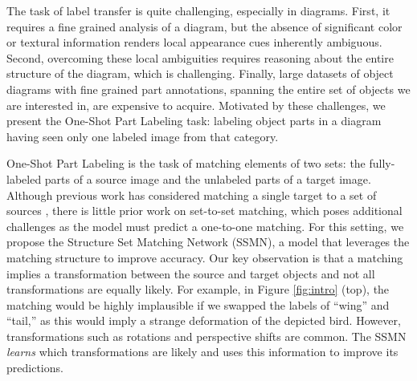 \documentclass[10pt,twocolumn,letterpaper]{article}
\begin{document}
The task of label transfer is quite challenging, especially in diagrams. First, it requires a fine grained analysis of a diagram, but the absence of significant color or textural information renders local appearance cues inherently ambiguous. Second, overcoming these local ambiguities requires reasoning about the entire structure of the diagram, which is challenging. Finally, large datasets of object diagrams with fine grained part annotations, spanning the entire set of objects we are interested in, are expensive to acquire. Motivated by these challenges, we present the One-Shot Part Labeling task: labeling object parts in a diagram having seen only one labeled image from that category. 


One-Shot Part Labeling is the task of matching elements of two sets: the fully-labeled parts of a source image and the unlabeled parts of a target image. Although previous work has considered matching a single target to a set of sources \cite{Koch2015SiameseNN,vinyalsBLKW16}, there is little prior work on set-to-set matching, which poses additional challenges as the model must predict a one-to-one matching. For this setting, we propose the Structure Set Matching Network (SSMN), a model that leverages the matching structure to improve accuracy. Our key observation is that a matching implies a transformation between the source and target objects and not all transformations are equally likely. For example, in Figure \ref{fig:intro} (top), the matching would be highly implausible if we swapped the labels of ``wing'' and ``tail,'' as this would imply a strange deformation of the depicted bird. However, transformations such as rotations and perspective shifts are common. The SSMN \emph{learns} which transformations are likely and uses this information to improve its predictions.
\end{document}
